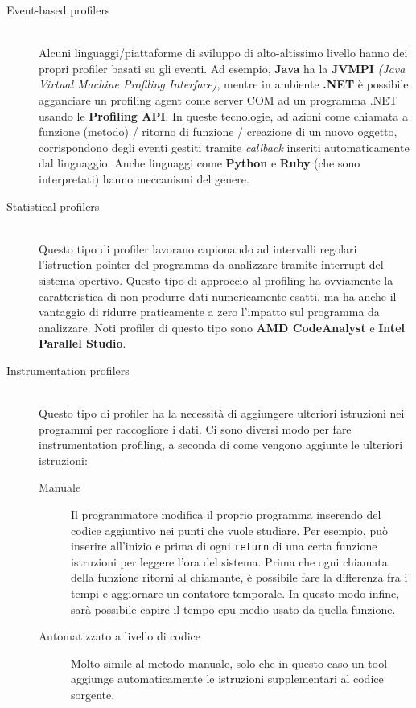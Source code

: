 \documentclass[a4paper,11pt]{report}
\begin{document}
\begin{description}
\item[Event-based profilers] \hfill \\
Alcuni linguaggi/piattaforme di sviluppo di alto-altissimo livello hanno dei propri profiler basati su gli eventi. Ad esempio, \textbf{Java} ha la \textbf{JVMPI} \textit{(Java Virtual Machine Profiling Interface)}, mentre in ambiente \textbf{.NET} è possibile agganciare un profiling agent come server COM ad un programma .NET usando le \textbf{Profiling API}. In queste tecnologie, ad azioni come chiamata a funzione (metodo) / ritorno di funzione / creazione di un nuovo oggetto, corrispondono degli eventi gestiti tramite \textit{callback} inseriti automaticamente dal linguaggio. Anche linguaggi come \textbf{Python} e \textbf{Ruby} (che sono interpretati) hanno meccanismi del genere.
\item[Statistical profilers] \hfill \\
Questo tipo di profiler lavorano capionando ad intervalli regolari l'istruction pointer del programma da analizzare tramite interrupt del sistema opertivo. Questo tipo di approccio al profiling ha ovviamente la caratteristica di non produrre dati numericamente esatti, ma ha anche il vantaggio di ridurre praticamente a zero l'impatto sul programma da analizzare. Noti profiler di questo tipo sono \textbf{AMD CodeAnalyst} e \textbf{Intel Parallel Studio}. 
\item[Instrumentation profilers] \hfill \\
Questo tipo di profiler ha la necessità di aggiungere ulteriori istruzioni nei programmi per raccogliore i dati. Ci sono diversi modo per fare instrumentation profiling, a seconda di come vengono aggiunte le ulteriori istruzioni:
\begin{description}
\item[Manuale]
Il programmatore modifica il proprio programma inserendo del codice aggiuntivo nei punti che vuole studiare. Per esempio, può inserire all'inizio e prima di ogni \verb|return| di una certa funzione istruzioni per leggere l'ora del sistema. Prima che ogni chiamata della funzione ritorni al chiamante, è possibile fare la differenza fra i tempi e aggiornare un contatore temporale. In questo modo infine, sarà possibile capire il tempo cpu medio usato da quella funzione.
\item[Automatizzato a livello di codice]
Molto simile al metodo manuale, solo che in questo caso un tool aggiunge automaticamente le istruzioni supplementari al codice sorgente.

\end{description}
\end{description}
\end{document}
